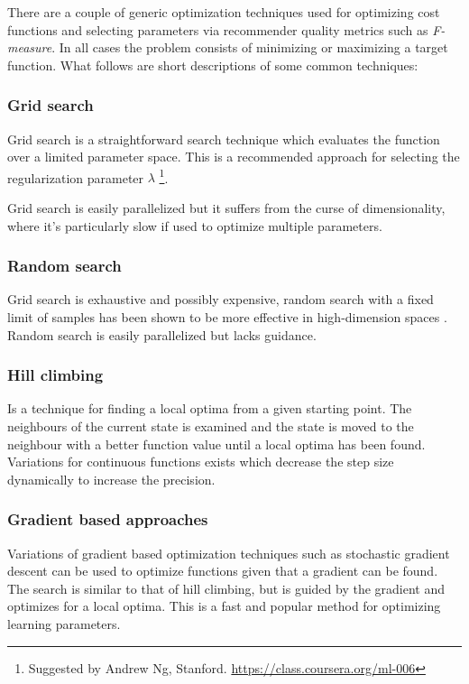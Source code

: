 There are a couple of generic optimization techniques used for optimizing cost functions and selecting parameters via recommender quality metrics such as \textit{F-measure}. In all cases the problem consists of minimizing or maximizing a target function. What follows are short descriptions of some common techniques:


\subsubsection{Grid search}

Grid search is a straightforward search technique which evaluates the function over a limited parameter space. This is a recommended approach for selecting the regularization parameter $\lambda$
\footnote{Suggested by Andrew Ng, Stanford. \url{https://class.coursera.org/ml-006}}.

Grid search is easily parallelized but it suffers from the curse of dimensionality, where it's particularly slow if used to optimize multiple parameters.


\subsubsection{Random search}

Grid search is exhaustive and possibly expensive, random search with a fixed limit of samples has been shown to be more effective in high-dimension spaces \citep{bergstra2012random}. Random search is easily parallelized but lacks guidance.


\subsubsection{Hill climbing}

Is a technique for finding a local optima from a given starting point. The neighbours of the current state is examined and the state is moved to the neighbour with a better function value until a local optima has been found. Variations for continuous functions exists which decrease the step size dynamically to increase the precision.


\subsubsection{Gradient based approaches}

Variations of gradient based optimization techniques such as stochastic gradient descent can be used to optimize functions given that a gradient can be found. The search is similar to that of hill climbing, but is guided by the gradient and optimizes for a local optima.  This is a fast and popular method for optimizing learning parameters.
\cite{hu2008collaborative}


